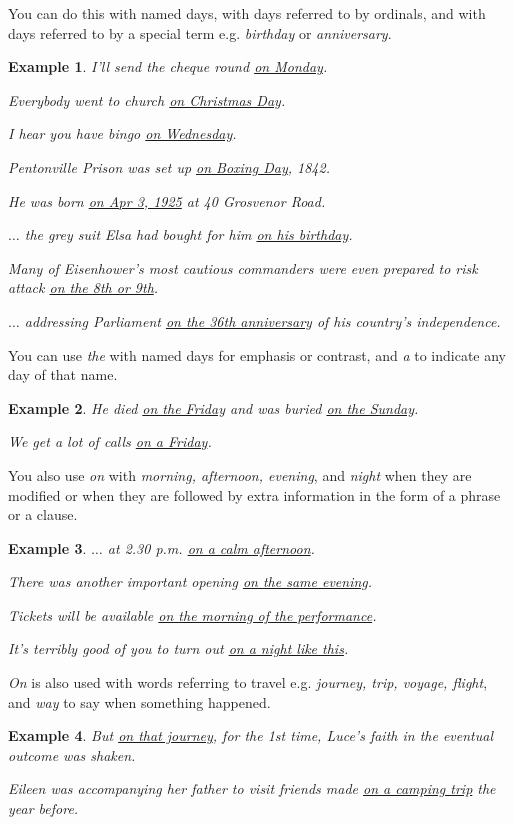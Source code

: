 \documentclass[oneside]{book}
\numberwithin{equation}{section}
\newtheorem{example}{Example}[section]
\begin{document}
You can do this with named days, with days referred to by ordinals, and with days referred to by a special term e.g. \textit{birthday} or \textit{anniversary}.
\begin{example}
    I'll send the cheque round \underline{on Monday}.
    
    Everybody went to church \underline{on Christmas Day}.
    
    I hear you have bingo \underline{on Wednesday}.
    
    Pentonville Prison was set up \underline{on Boxing Day}, 1842.
    
    He was born \underline{on Apr 3, 1925} at 40 Grosvenor Road.
    
    $\ldots$ the grey suit Elsa had bought for him \underline{on his birthday}.
    
    Many of Eisenhower's most cautious commanders were even prepared to risk attack \underline{on the 8th or 9th}.
    
    $\ldots$ addressing Parliament \underline{on the 36th anniversary} of his country's independence.
\end{example}
You can use \textit{the} with named days for emphasis or contrast, and \textit{a} to indicate any day of that name.
\begin{example}
    He died \underline{on the Friday} and was buried \underline{on the Sunday}.
    
    We get a lot of calls \underline{on a Friday}.
\end{example}
You also use \textit{on} with \textit{morning, afternoon, evening}, and \textit{night} when they are modified or when they are followed by extra information in the form of a phrase or a clause.
\begin{example}
    $\ldots$ at 2.30 p.m. \underline{on a calm afternoon}.
    
    There was another important opening \underline{on the same evening}.
    
    Tickets will be available \underline{on the morning of the performance}.
    
    It's terribly good of you to turn out \underline{on a night like this}.
\end{example}
%
\noindent{} \textit{On} is also used with words referring to travel e.g. \textit{journey, trip, voyage, flight}, and \textit{way} to say when something happened.
\begin{example}
    But \underline{on that journey}, for the 1st time, Luce's faith in the eventual outcome was shaken.
    
    Eileen was accompanying her father to visit friends made \underline{on a camping trip} the year before.
\end{example}
\end{document}
